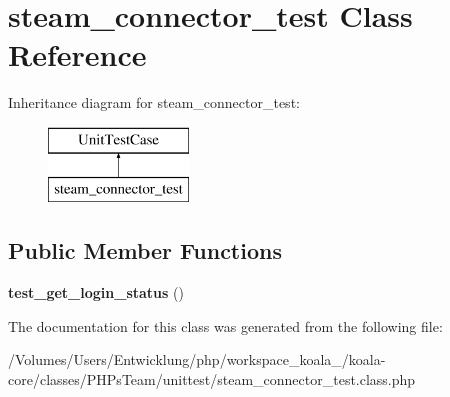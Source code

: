 \hypertarget{classsteam__connector__test}{
\section{steam\_\-connector\_\-test Class Reference}
\label{classsteam__connector__test}
}
Inheritance diagram for steam\_\-connector\_\-test:\begin{figure}[H]
\begin{center}
\leavevmode
\includegraphics[height=2.000000cm]{classsteam__connector__test}
\end{center}
\end{figure}
\subsection*{Public Member Functions}
\begin{DoxyCompactItemize}
\item 
\hypertarget{classsteam__connector__test_af0140bd398b66fd0cb6b8494acad4be3}{
{\bfseries test\_\-get\_\-login\_\-status} ()}
\label{classsteam__connector__test_af0140bd398b66fd0cb6b8494acad4be3}

\end{DoxyCompactItemize}


The documentation for this class was generated from the following file:\begin{DoxyCompactItemize}
\item 
/Volumes/Users/Entwicklung/php/workspace\_\-koala\_/koala-\/core/classes/PHPsTeam/unittest/steam\_\-connector\_\-test.class.php\end{DoxyCompactItemize}

